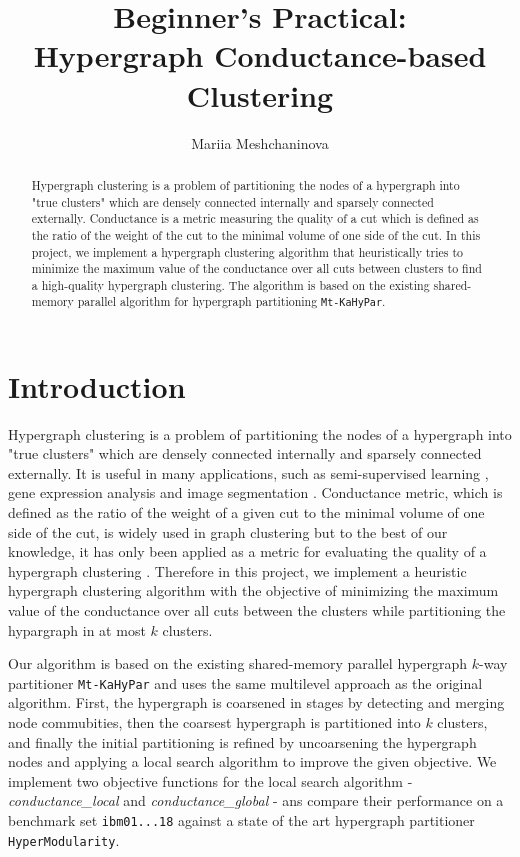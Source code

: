 \documentclass[acmsmall,nonacm,screen,review]{acmart}
\title{Beginner's Practical: \\ Hypergraph Conductance-based Clustering}
\author{Mariia Meshchaninova}
\affiliation{%
  \institution{Heidelberg University}
  \streetaddress{Im Neuenheimer Feld 205}
  \city{Heidelberg}
  \state{Baden-Württemberg}
  \country{Germany}
  \postcode{69120}
}
\date{}
\begin{document}
\begin{abstract}
Hypergraph clustering is a problem of partitioning the nodes of 
a hypergraph into "true clusters" which are densely connected internally 
and sparsely connected externally. Conductance is a metric measuring the 
quality of a cut which is defined as the ratio of the weight of the cut 
to the minimal volume of one side of the cut.
In this project, we implement a hypergraph clustering algorithm that
heuristically tries to minimize the maximum value of the conductance 
over all cuts between clusters to find a high-quality hypergraph 
clustering. The algorithm is based on the existing shared-memory 
parallel algorithm for hypergraph partitioning \texttt{Mt-KaHyPar}.
\end{abstract}
\maketitle

\section{Introduction}
Hypergraph clustering is a problem of partitioning the nodes of a hypergraph
into "true clusters" which are densely connected internally and sparsely
connected externally. It is useful in many applications, such as 
semi-supervised learning \cite{ApplicationLearning}, 
gene expression analysis \cite{ApplicationGeneExpression}
and image segmentation \cite{ApplicationImageSegmentation}. 
Conductance metric, which is defined as the ratio of the weight of a given
cut to the minimal volume of one side of the cut, is widely used in graph 
clustering \cite{GraphConductance2023,GraphConductance2006} but to the best
of our knowledge, it has only been applied as a metric for evaluating the
quality of a hypergraph clustering \cite{HyperSF}. Therefore in this 
project, we implement a heuristic hypergraph clustering algorithm with the
objective of minimizing the maximum value of the conductance over all cuts between
the clusters while partitioning the hypargraph in at most $k$ clusters. 

\noindent Our algorithm is based on the existing shared-memory parallel 
hypergraph $k$-way partitioner \texttt{Mt-KaHyPar} and uses the same 
multilevel approach as the original algorithm. First, the hypergraph is 
coarsened in stages by detecting and merging node commubities, then the 
coarsest hypergraph is partitioned into $k$ clusters, and finally the 
initial partitioning is refined by uncoarsening the hypergraph nodes and 
applying a local search algorithm to improve the given objective. We 
implement two objective functions for the local search algorithm - \textit{conductance\_local} and \textit{conductance\_global} - 
ans compare their performance on a benchmark set \texttt{ibm01...18} 
against a state of the art hypergraph partitioner \texttt{HyperModularity}.
\end{document}
